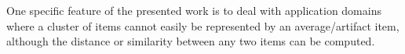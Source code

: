 One specific feature of the presented work is to deal with application domains where a cluster of items cannot easily be represented by an average/artifact item, although the distance or similarity between any two items can be computed. 



